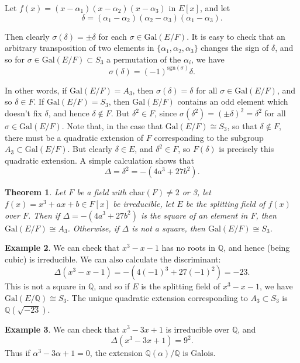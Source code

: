 \documentclass[12pt]{report}
\newtheorem{theorem}{Theorem}[section]
\theoremstyle{definition}
\newtheorem{example}[theorem]{Example}
\newcommand{\charr}{\text{char}}
\newcommand{\Gal}{\text{Gal}}
\newcommand{\sgn}{\text{sgn}}
\newcommand{\QQ}{\mathbb{Q}}
\begin{document}
Let $f(x) = (x - \alpha_1)(x - \alpha_2)(x - \alpha_3)$ in $E[x]$, and let
$$\delta = (\alpha_1 - \alpha_2)(\alpha_2 - \alpha_3)(\alpha_1 - \alpha_3).$$

Then clearly $\sigma(\delta) = \pm\delta$ for each $\sigma \in \Gal(E/F)$. It is easy to check that an arbitrary transposition of two elements in $\{\alpha_1, \alpha_2, \alpha_3\}$ changes the sign of $\delta$, and so for $\sigma \in \Gal(E/F) \subset S_3$ a permutation of the $\alpha_i$, we have
$$\sigma(\delta) = (-1)^{\sgn(\sigma)} \delta.$$

In other words, if $\Gal(E/F) =A_3$, then $\sigma(\delta) = \delta$ for all $\sigma\in \Gal(E/F)$, and so $\delta\in F$. If $\Gal(E/F) = S_3$, then $\Gal(E/F)$ contains an odd element which doesn't fix $\delta$, and hence $\delta \notin F$. But $\delta^2\in F$, since $\sigma(\delta^2) = (\pm\delta)^2 =\delta^2$ for all $\sigma\in \Gal(E/F)$. Note that, in the case that $\Gal(E/F) \cong S_3$, so that $\delta \notin F$, there must be a quadratic extension of $F$ corresponding to the subgroup $A_3 \subset \Gal(E/F)$. But clearly $\delta\in E$, and $\delta^2\in F$, so $F(\delta)$ is precisely this quadratic extension. A simple calculation shows that $$\Delta =\delta^2 =  -(4a^3+27b^2).$$

\begin{theorem}
	Let $F$ be a field with $\charr(F) \not= 2$ or 3, let $f(x) = x^3+ax+b\in F[x]$  be irreducible, let $E$ be the splitting field of $f(x)$ over $F$. Then if $\Delta = -(4a^3+27b^2)$ is the square of an element in $F$, then $\Gal(E/F) \cong A_3$. Otherwise, if $\Delta$ is not a square, then $\Gal(E/F) \cong S_3$.
\end{theorem}

\begin{example}
	We can check that $x^3 - x - 1$ has no roots in $\QQ$, and hence (being cubic) is irreducible. We can also calculate the discriminant:
	$$\Delta(x^3 - x - 1) = -(4(-1)^3 + 27(-1)^2) = -23.$$
	This is not a square in $\QQ$, and so if $E$ is the splitting field of $x^3 - x - 1$, we have $\Gal(E/\QQ) \cong S_3$. The unique quadratic extension corresponding to $A_3 \subset S_3$ is $\QQ(\sqrt{-23})$.
\end{example}

\begin{example}
	We can check that $x^3 - 3x + 1$ is irreducible over $\QQ$, and
	$$\Delta(x^3 - 3x + 1) = 9^2.$$
	Thus if $\alpha^3 - 3\alpha + 1 = 0$, the extension $\QQ(\alpha)/\QQ$ is Galois.
\end{example}
\end{document}
